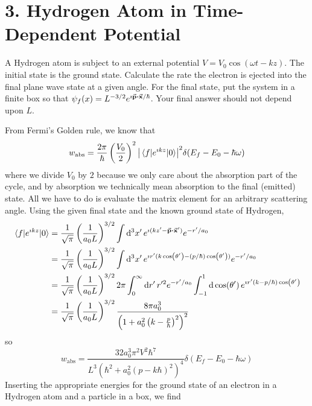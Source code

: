 \documentclass[a4paper,twoside]{article}
\begin{document}
\section*{3. Hydrogen Atom in Time-Dependent Potential}
A Hydrogen atom is subject to an external potential $ V = V_0 \cos(\omega t - kz) $. The initial state is the ground state. Calculate the rate the electron is ejected into the final plane wave state at a given angle. For the final state, put the system in a finite box so that $ \psi_f(x) = L^{-3/2} e^{\imath \va{p} \vdot \va{x} / \hbar} $. Your final answer should not depend upon $ L $.
\begin{problem}
    From Fermi's Golden rule, we know that
    \begin{equation}
        w_{\text{abs}} = \frac{2 \pi}{\hbar} \left( \frac{V_0}{2} \right)^2 \abs{\mel{f}{e^{\imath k z}}{0}}^2 \delta(E_f - E_0 - \hbar \omega)
    \end{equation}
    where we divide $ V_0 $ by $ 2 $ because we only care about the absorption part of the cycle, and by absorption we technically mean absorption to the final (emitted) state. All we have to do is evaluate the matrix element for an arbitrary scattering angle. Using the given final state and the known ground state of Hydrogen,
    \begin{align}
        \mel{f}{e^{\imath k z}}{0} &= \frac{1}{\sqrt{\pi}} \left( \frac{1}{a_0 L} \right)^{3/2} \int \dd[3]{x'} e^{\imath (kz' - \va{p} \vdot \va{x}')} e^{-r'/ a_0} \\
        &= \frac{1}{\sqrt{\pi}} \left( \frac{1}{a_0 L} \right)^{3/2} \int \dd[3]{x'} e^{\imath r' (k \cos(\theta') - (p/ \hbar) \cos(\theta'))} e^{- r'/a_0} \\
        &= \frac{1}{\sqrt{\pi}} \left( \frac{1}{a_0 L} \right)^{3/2} 2 \pi \int_0^{\infty} \dd{r'} r'^2 e^{-r' / a_0} \int_{-1}^1 \dd{\cos(\theta')} e^{\imath r' (k - p / \hbar) \cos(\theta')} \\
        &= \frac{1}{\sqrt{\pi}} \left( \frac{1}{a_0 L} \right)^{3/2} \frac{8 \pi a_0^3}{\left( 1 + a_0^2 \left( k - \frac{p}{\hbar} \right)^2 \right)^2} 
    \end{align}
    so
    \begin{equation}
        w_{\text{abs}} = \frac{32 a_0^3 \pi^2 V^2 \hbar^7}{L^3 \left( \hbar^2 + a_0^2 (p - k \hbar)^2 \right)^4} \delta(E_f - E_0 - \hbar \omega)
    \end{equation}
    Inserting the appropriate energies for the ground state of an electron in a Hydrogen atom and a particle in a box, we find

\end{problem}
\end{document}
